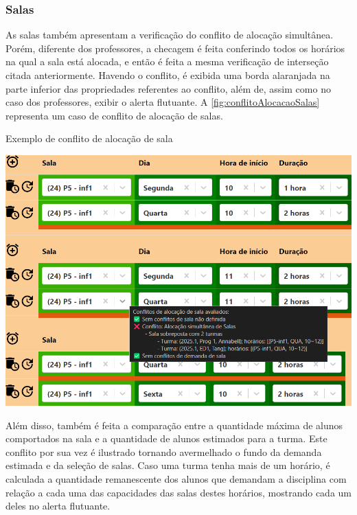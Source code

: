 \subsubsection{Salas} \label{sssec:Salas}

As salas também apresentam a verificação do conflito de alocação simultânea. Porém, diferente dos professores, a checagem é feita conferindo todos os horários na qual a sala está alocada, e então é feita a mesma verificação de interseção citada anteriormente. Havendo o conflito, é exibida uma borda alaranjada na parte inferior das propriedades referentes ao conflito, além de, assim como no caso dos professores, exibir o alerta flutuante. A \autoref{fig:conflitoAlocacaoSalas} representa um caso de conflito de alocação de salas.

\begin{MyCenteredFigure}
  \caption{Exemplo de conflito de alocação de sala}
  \label{fig:conflitoAlocacaoSalas}
  \includegraphics[width=\textwidth]{files/img/2.02!5-desenvolvimento/2.02!5.1.5-conflitos/Alocação de Salas - Sala}
\end{MyCenteredFigure}

Além disso, também é feita a comparação entre a quantidade máxima de alunos comportados na sala e a quantidade de alunos estimados para a turma. Este conflito por sua vez é ilustrado tornando avermelhado o fundo da demanda estimada e da seleção de salas. Caso uma turma tenha mais de um horário, é calculada a quantidade remanescente dos alunos que demandam a disciplina com relação a cada uma das capacidades das salas destes horários, mostrando cada um deles no alerta flutuante.

